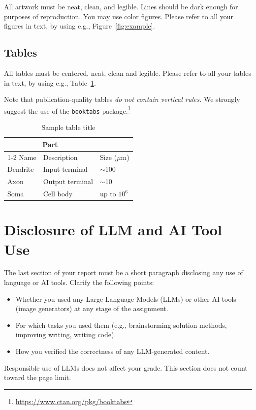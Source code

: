 \documentclass{article}
\begin{document}
All artwork must be neat, clean, and legible. Lines should be dark enough for
purposes of reproduction. You may use color figures. Please refer to all your figures in text, by using e.g., Figure~\ref{fig:example}. 

\subsection{Tables}
All tables must be centered, neat, clean and legible. Please refer to all your tables in text, by using e.g., Table~\ref{tab:example}.

Note that publication-quality tables \emph{do not contain vertical rules.} We
strongly suggest the use of the \verb+booktabs+ package.\footnote{\url{https://www.ctan.org/pkg/booktabs}}


\begin{table}[h]
  \caption{Sample table title}
  \label{tab:example}
  \centering
  \begin{tabular}{lll}
    \toprule
    \multicolumn{2}{c}{Part}                   \\
    \cmidrule(r){1-2}
    Name     & Description     & Size ($\mu$m) \\
    \midrule
    Dendrite & Input terminal  & $\sim$100     \\
    Axon     & Output terminal & $\sim$10      \\
    Soma     & Cell body       & up to $10^6$  \\
    \bottomrule
  \end{tabular}
\end{table}


\section{Disclosure of LLM and AI Tool Use}

The last section of your report must be a short paragraph disclosing any use of language or AI tools. Clarify the following points:
\begin{itemize}
    \item Whether you used any Large Language Models (LLMs) or other AI tools (image generators) at any stage of the assignment.
    \item For which tasks you used them (e.g., brainstorming solution methods, improving writing, writing code).
    \item How you verified the correctness of any LLM-generated content.
\end{itemize}
 Responsible use of LLMs does not affect your grade. This section does not count toward the page limit. 
\end{document}
